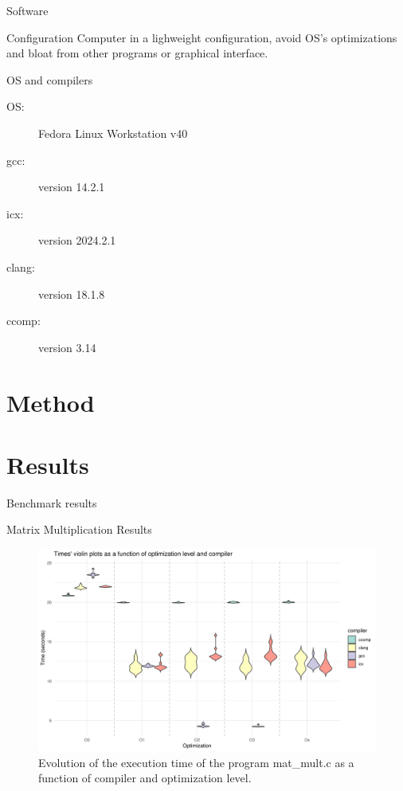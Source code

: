\documentclass[english]{beamer}
\begin{document}
    
    \begin{frame}{Software}
        \begin{block}{Configuration}
            Computer in a lighweight configuration, avoid OS's optimizations and bloat from other programs or graphical interface.
        \end{block}
        \begin{block}{OS and compilers}
            \begin{description}
                \item[OS: ] Fedora Linux Workstation v40
                \item[gcc: ] version 14.2.1
                \item[icx: ] version 2024.2.1
                \item[clang: ] version 18.1.8
                \item[ccomp: ] version 3.14
            \end{description}
        \end{block}
    \end{frame}
    
    \section{Method}
    
    
    
    \section{Results}
    \begin{frame}[standout]
    Benchmark results
    \end{frame}
    
    \begin{frame}{Matrix Multiplication Results}
    \begin{figure}[H]
    \centering
    \includegraphics[width=1\textwidth]{img/plots/violin_plot_mat_mult.png}
    \caption{Evolution of the execution time of the program mat\_mult.c as a function of compiler and optimization level.}
    \label{fig:image1}
    \end{figure}
    \end{frame}
    
\end{document}
